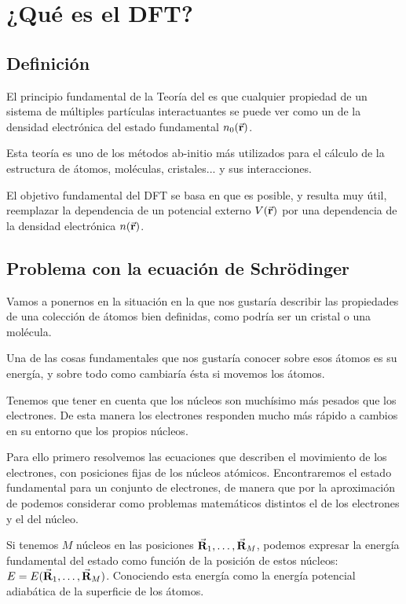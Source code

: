 \section{¿Qué es el DFT?}

\subsection{Definición}

El principio fundamental de la Teoría del  es que cualquier propiedad de un sistema de múltiples partículas interactuantes se puede ver como un  de la densidad electrónica del estado fundamental $n_0 (\va{r})$.

Esta teoría es uno de los métodos ab-initio más utilizados para el cálculo de la estructura de átomos, moléculas, cristales... y sus interacciones.

El objetivo fundamental del DFT se basa en que es posible, y resulta muy útil, reemplazar la dependencia de un potencial externo $V(\va{r})$ por una dependencia de la densidad electrónica $n(\va{r})$.

\subsection{Problema con la ecuación de Schrödinger} 

Vamos a ponernos en la situación en la que nos gustaría describir las propiedades de una colección de átomos bien definidas, como podría ser un cristal o una molécula.

Una de las cosas fundamentales que nos gustaría conocer sobre esos átomos es su energía, y sobre todo como cambiaría ésta si movemos los átomos.

Tenemos que tener en cuenta que los núcleos son muchísimo más pesados que los electrones. De esta manera los electrones responden mucho más rápido a cambios en su entorno que los propios núcleos.

Para ello primero resolvemos las ecuaciones que describen el movimiento de los electrones, con posiciones fijas de los núcleos atómicos. Encontraremos el estado fundamental para un conjunto de electrones, de manera que por la aproximación de  podemos considerar como problemas matemáticos distintos el de los electrones y el del núcleo.

Si tenemos $M$ núcleos en las posiciones $\va{R}_1 , \dots , \va{R}_M$, podemos expresar la energía fundamental del estado como función de la posición de estos núcleos: $E = E(\va{R}_1 , \dots , \va{R}_M)$. Conociendo esta energía como la energía potencial adiabática de la superficie de los átomos.

